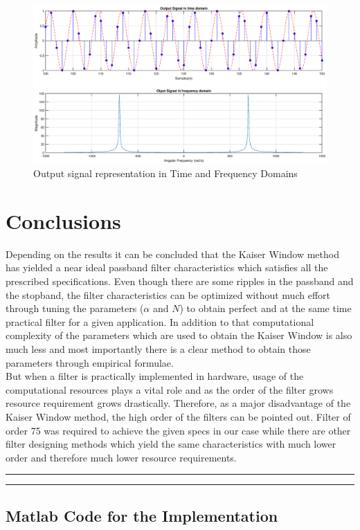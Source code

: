 \documentclass[a4paper,11pt]{article}%
\begin{document}
\begin{figure}[!h]
	\centering
	\includegraphics[scale=0.45]{figures/output-signal}
	\caption{Output signal representation in Time and Frequency Domains}
\end{figure}
\pagebreak

\section{Conclusions}

Depending on the results it can be concluded that the Kaiser Window method has yielded a near ideal passband filter characteristics which satisfies all the prescribed specifications. Even though there are some ripples in the passband and the stopband, the filter characteristics can be optimized without much effort through tuning the parameters ($\alpha$ and $N$) to obtain perfect and at the same time practical filter for a given application. In addition to that computational complexity of the parameters which are used to obtain the Kaiser Window is also much less and most importantly there is a clear method to obtain those parameters through empirical formulae.\\

But when a filter is practically implemented in hardware, usage of the computational resources plays a vital role and as the order of the filter grows resource requirement grows drastically. Therefore,  as a major disadvantage of the Kaiser Window method, the high order of the filters can be pointed out. Filter of order 75 was required to achieve the given specs in our case while there are other filter designing methods which yield the same characteristics with much lower order and therefore much lower resource requirements.

\vfill
\hrule
\vspace{0.5cm}




\vspace{1cm}
\hrule
\vspace{0.5cm}
\begin{appendices}
	\section{Matlab Code for the Implementation}
	
\end{appendices}



\end{document}
